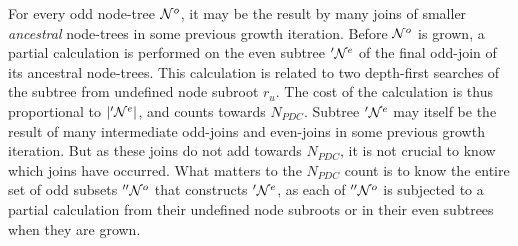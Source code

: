 For every odd node-tree $\mathcal{N}^o$, it may be the result by many joins of smaller \emph{ancestral} node-trees in some previous growth iteration. Before $\mathcal{N}^o$ is grown, a partial calculation is performed on the even subtree $'\mathcal{N}^e$ of the final odd-join of its ancestral node-trees. This calculation is related to two depth-first searches of the subtree from undefined node subroot $r_u$. The cost of the calculation is thus proportional to $|'\mathcal{N}^e|$, and counts towards $N_{PDC}$. Subtree $'\mathcal{N}^e$ may itself be the result of many intermediate odd-joins and even-joins in some previous growth iteration. But as these joins do not add towards $N_{PDC}$, it is not crucial to know which joins have occurred. What matters to the $N_{PDC}$ count is to know the entire set of odd subsets $''\mathcal{N}^o$ that constructs $'\mathcal{N}^e$, as each of $''\mathcal{N}^o$ is subjected to a partial calculation from their undefined node subroots or in their even subtrees when they are grown.

